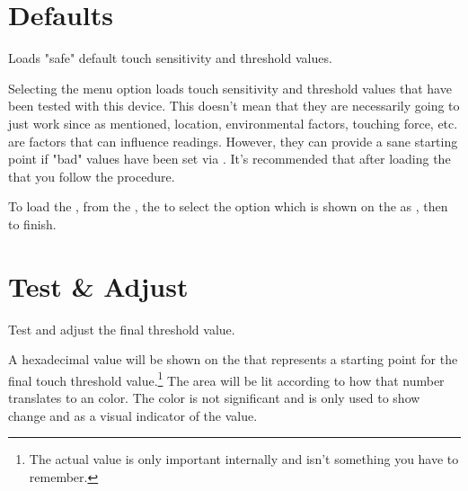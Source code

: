 
\section{Defaults} 

Loads "safe" default touch sensitivity and threshold values.

\par\medskip

Selecting the  menu option loads touch sensitivity and threshold
values that have been tested with this device.  This doesn't mean that they are
necessarily going to just work since as mentioned, location, environmental
factors, touching force, etc. are factors that can influence readings.
However, they can provide a sane starting point if "bad" values have been set
via .  It's recommended that after loading the  that you
follow the \hyperref[Touch Calibration]{} procedure.

\par\medskip

To load the , from the \hyperref[Touch - Menu]{}, 
the  to select the option which is shown on the  as
, then  to finish.


\section{Test \& Adjust} \label{Test and Adjust} 

Test and adjust the final threshold value.

\par\medskip

A hexadecimal value will be shown on the  that represents a starting
point for the final touch threshold value.\footnote{ The actual value is only
important internally and isn't something you have to remember.} The  area
will be lit according to how that number translates to an  color.  The
color is not significant and is only used to show change and as a visual
indicator of the value.

